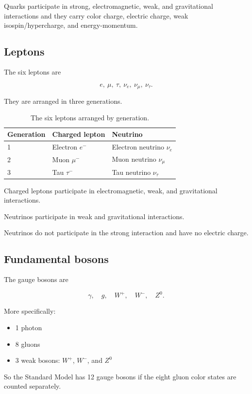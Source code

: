 \documentclass[12pt]{article}
\begin{document}
Quarks participate in strong, electromagnetic, weak, and gravitational interactions and they
carry color charge, electric charge, weak isospin/hypercharge, and energy-momentum.

\subsection*{Leptons}

The six leptons are

\[
e,\ \mu,\ \tau,\ \nu_e,\ \nu_\mu,\ \nu_\tau.
\]

They are arranged in three generations.

\begin{table}[h!]
\centering
\begin{tabular}{lll}
\toprule
\textbf{Generation} & \textbf{Charged lepton} & \textbf{Neutrino} \\
\midrule
1 & Electron $e^-$ & Electron neutrino $\nu_e$ \\
2 & Muon $\mu^-$ & Muon neutrino $\nu_\mu$ \\
3 & Tau $\tau^-$ & Tau neutrino $\nu_\tau$ \\
\bottomrule
\end{tabular}
\caption{The six leptons arranged by generation.}
\label{tab:leptons}
\end{table}

Charged leptons participate in electromagnetic, weak, and gravitational interactions.

Neutrinos participate in weak and gravitational interactions.

Neutrinos do not participate in the strong interaction and have no electric charge.

\subsection*{Fundamental bosons}

The gauge bosons are

\[
\gamma,\quad g,\quad W^+,\quad W^-,\quad Z^0.
\]

More specifically:

\begin{itemize}
    \item 1 photon
    \item 8 gluons
    \item 3 weak bosons: $W^+$, $W^-$, and $Z^0$
\end{itemize}

So the Standard Model has 12 gauge bosons if the eight gluon color states are counted separately.
\end{document}
